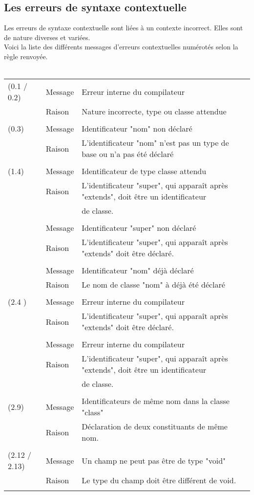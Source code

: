 \documentclass[11pt]{article}
\begin{document}
   \subsection{Les erreurs de syntaxe contextuelle}
      Les erreurs de syntaxe contextuelle sont liées à un contexte incorrect. Elles sont de nature diverses et variées.\\
      Voici la liste des différents messages d'erreurs contextuelles numérotés selon la règle renvoyée.
      \\
      \\
      \begin{tabular}{lll}
      (0.1 / 0.2) & Message & Erreur interne du compilateur\\      
      & Raison & Nature incorrecte, type ou classe attendue\\
      \\
      (0.3)& Message & Identificateur "nom" non déclaré\\
      & Raison & L'identificateur "nom" n'est pas un type de base ou n'a pas été déclaré\\

      \\
      (1.4) & Message & Identificateur de type classe attendu\\
      & Raison & L'identificateur "super", qui apparaît après "extends", doit être un identificateur \\
      && de classe.\\
      \\
      & Message & Identificateur "super" non déclaré\\
      & Raison & L'identificateur "super", qui apparaît après "extends" doit être déclaré.\\
      \\
      & Message & Identificateur "nom" déjà déclaré\\
      & Raison  & Le nom de classe "nom" à déjà été déclaré\\
      \\
      (2.4 )& Message & Erreur interne du compilateur\\ 
      & Raison & L'identificateur "super", qui apparaît après "extends" doit être déclaré.\\      
      \\
      & Message & Erreur interne du compilateur\\
      & Raison & L'identificateur "super", qui apparaît après "extends", doit être un identificateur \\
      && de classe.\\
      \\
      (2.9)& Message & Identificateurs de même nom dans la classe "class"\\ 
      & Raison & Déclaration de deux constituants de même nom.\\      
      \\
      (2.12 / 2.13) & Message & Un champ ne peut pas être de type "void"\\ 
      & Raison & Le type du champ doit être différent de void.\\    
      \\
      \end{tabular}
      
\end{document}
